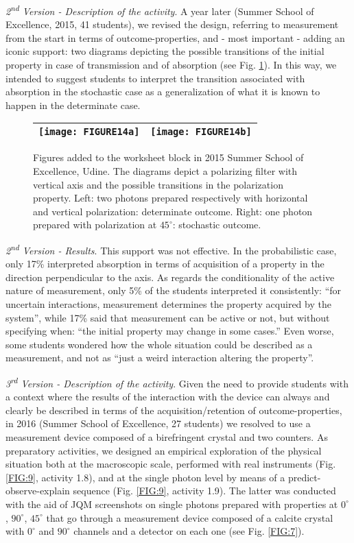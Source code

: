 \documentclass[twocolumn,secnumarabic,amssymb, nobibnotes, aps, prd, nofootinbib]{revtex4-2}
\begin{document}
\emph{2\textsuperscript{nd} Version - Description of the activity}. A year later (Summer School of Excellence, 2015, 41 students), we revised the design, referring to measurement from the start in terms of outcome-properties, and
- most important - adding an iconic support: two diagrams depicting the possible transitions of the initial property in case of transmission and of absorption (see Fig. \ref{FIG:14}). In this way, we intended to suggest students to interpret the transition associated with absorption in the stochastic case as a generalization of what it is known to happen in the determinate case.
\begin{figure} \centering
\begin{tabular}{|r|l|} \hline
    \texttt{[image: FIGURE14a]} &
    \texttt{[image: FIGURE14b]} \\ \hline
\end{tabular}
    \caption{Figures added to the worksheet block in 2015 Summer School of Excellence, Udine. The diagrams depict a polarizing filter with vertical axis and the possible transitions in the polarization property. Left: two photons prepared respectively with horizontal and vertical polarization: determinate outcome. Right: one photon prepared with polarization at $45^{\circ}$: stochastic outcome.}
    \label{FIG:14}
\end{figure}

\emph{2\textsuperscript{nd} Version - Results}. This support was not effective. In the probabilistic case, only 17\% interpreted absorption in terms of acquisition of a property in the direction perpendicular to the axis. As regards the conditionality of the active nature of measurement, only 5\% of the students interpreted it consistently: ``for uncertain interactions, measurement determines the property acquired by the system'', while 17\% said that measurement can be active or not, but without specifying when: ``the initial property may change in some cases.'' Even worse, some students wondered how the whole situation could be described as a measurement, and not as ``just a weird interaction altering the property''.

\emph{3\textsuperscript{rd} Version - Description of the activity}. Given the need to provide students with a context where the results of the interaction with the device can always and clearly be described in terms of the acquisition/retention of outcome-properties, in 2016 (Summer School of Excellence, 27 students) we resolved to use a measurement device composed of a birefringent crystal and two counters. As preparatory activities, we designed an empirical exploration of the physical situation both at the macroscopic scale, performed with real instruments (Fig. \ref{FIG:9}, activity 1.8), and at the single photon level by means of a predict-observe-explain sequence \cite{White1992} (Fig. \ref{FIG:9}, activity 1.9). The latter was conducted with the aid of JQM screenshots on single photons prepared with properties at $0^{\circ}$, $90^{\circ}$, $45^{\circ}$ that go through a measurement device composed of a calcite crystal with $0^{\circ}$ and $90^{\circ}$ channels and a detector on each one (see Fig. \ref{FIG:7}).
\end{document}
